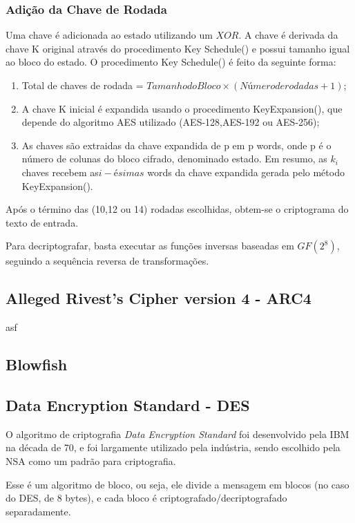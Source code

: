  \subsubsection{Adição da Chave de Rodada}

  Uma chave é adicionada ao estado utilizando um  $XOR$. A chave é derivada da chave K original através do procedimento Key Schedule() e possui tamanho igual ao bloco do estado. O procedimento Key Schedule() é feito da seguinte forma:
\begin{enumerate}
\item Total de chaves de rodada = $Tamanho do Bloco \times (Número de rodadas+1)$;
\item A chave K inicial  é expandida usando o procedimento KeyExpansion(), que depende do algoritmo AES utilizado (AES-128,AES-192 ou AES-256);
\item As chaves são extraidas da chave expandida de p em p words, onde p é o número de colunas do bloco cifrado, denominado estado. Em resumo, as $k_{i}$ chaves recebem as$i-ésimas$ words da chave expandida gerada pelo método KeyExpansion().
\end{enumerate}

Após o término das (10,12 ou 14) rodadas escolhidas, obtem-se o criptograma do texto de entrada.

Para decriptografar, basta executar as funções inversas baseadas em $GF(2^{8})$, seguindo a sequência reversa de transformações.

\subsection{Alleged Rivest's Cipher version 4 - ARC4}
asf 
\subsection{Blowfish}

\subsection{Data Encryption Standard - DES}

O algoritmo de criptografia \textit{Data Encryption Standard} foi desenvolvido pela IBM na década de 70, e foi largamente utilizado pela indústria, sendo escolhido pela NSA como um padrão para criptografia. \cite{stallings2011cryptography}

Esse é um algoritmo de bloco, ou seja, ele divide a mensagem em blocos (no caso do DES, de 8 bytes), e cada bloco é criptografado/decriptografado separadamente.

